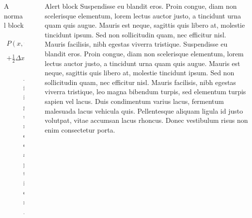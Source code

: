 \documentclass[final]{beamer}
\newlength{\sepwidth}
\newlength{\colwidth}
\newcommand{\separatorcolumn}{\begin{column}{\sepwidth}\end{column}}
\begin{document}
\begin{frame}[t]
\begin{columns}[t]
\begin{column}{\colwidth}
\begin{block}{A normal block}
    
\begin{align*}
P(x,t) \approx
\int  P(x,t) \Psi\left(x, \Delta x \right)  - \Delta t \, \Psi\left(x, \Delta x \right) \frac{ \partial P(x,t) }{ \partial t}  - \Delta x_{i} \, \frac{\partial }{\partial x_{i}}  P(x,t) \Psi\left(x, \Delta x \right)   \\
 + \frac{1}{2} \Delta x_{i} \Delta x_{j} \, \frac{\partial^2}{\partial x_{i} \partial x_{j} }  P(x,t) \Psi\left(x, \Delta x \right) \; \, \mathrm d^D \! \left( \Delta x \right)
\end{align*}

    \begin{figure}
      \centering
      \caption{A figure caption.}
    \end{figure}
    

  \end{block}


\end{column}

\separatorcolumn

\begin{column}{\colwidth}

  \begin{alertblock}{Alert block}
  Suspendisse eu blandit eros. Proin congue, diam non scelerisque elementum, lorem lectus auctor justo, a tincidunt urna quam quis augue. Mauris est neque, sagittis quis libero at, molestie tincidunt ipsum. Sed non sollicitudin quam, nec efficitur nisl. Mauris facilisis, nibh egestas viverra tristique.
  Suspendisse eu blandit eros. Proin congue, diam non scelerisque elementum, lorem lectus auctor justo, a tincidunt urna quam quis augue. Mauris est neque, sagittis quis libero at, molestie tincidunt ipsum. Sed non sollicitudin quam, nec efficitur nisl. Mauris facilisis, nibh egestas viverra tristique, leo magna bibendum turpis, sed elementum turpis sapien vel lacus. Duis condimentum varius lacus, fermentum malesuada lacus vehicula quis. Pellentesque aliquam ligula id justo volutpat, vitae accumsan lacus rhoncus. Donec vestibulum risus non enim consectetur porta. 
  

\end{alertblock}
\end{column}
\end{columns}
\end{frame}
\end{document}
